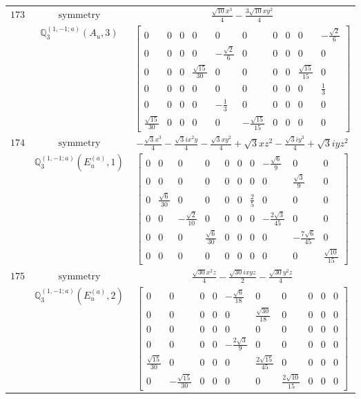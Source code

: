 \documentclass[fleqn,8pt,landscape]{jsarticle}
\begin{document}
\begin{longtable}{ccc}
$ 173 $ & $ \text{symmetry} $ & $ \frac{\sqrt{10} x^{3}}{4} - \frac{3 \sqrt{10} x y^{2}}{4} $ \\
$  $ & $ \mathbb{Q}_{3}^{(1,-1;a)}(A_{u},3) $ & $ \begin{bmatrix} 0 & 0 & 0 & 0 & 0 & 0 & 0 & 0 & 0 & - \frac{\sqrt{2}}{6} \\ 0 & 0 & 0 & 0 & - \frac{\sqrt{2}}{6} & 0 & 0 & 0 & 0 & 0 \\ 0 & 0 & 0 & \frac{\sqrt{15}}{30} & 0 & 0 & 0 & 0 & \frac{\sqrt{15}}{15} & 0 \\ 0 & 0 & 0 & 0 & 0 & 0 & 0 & 0 & 0 & \frac{1}{3} \\ 0 & 0 & 0 & 0 & - \frac{1}{3} & 0 & 0 & 0 & 0 & 0 \\ \frac{\sqrt{15}}{30} & 0 & 0 & 0 & 0 & - \frac{\sqrt{15}}{15} & 0 & 0 & 0 & 0 \end{bmatrix} $ \\ \hline
$ 174 $ & $ \text{symmetry} $ & $ - \frac{\sqrt{3} x^{3}}{4} - \frac{\sqrt{3} i x^{2} y}{4} - \frac{\sqrt{3} x y^{2}}{4} + \sqrt{3} x z^{2} - \frac{\sqrt{3} i y^{3}}{4} + \sqrt{3} i y z^{2} $ \\
$  $ & $ \mathbb{Q}_{3}^{(1,-1;a)}(E_{u}^{(a)},1) $ & $ \begin{bmatrix} 0 & 0 & 0 & 0 & 0 & 0 & 0 & - \frac{\sqrt{6}}{9} & 0 & 0 \\ 0 & 0 & 0 & 0 & 0 & 0 & 0 & 0 & \frac{\sqrt{3}}{9} & 0 \\ 0 & \frac{\sqrt{6}}{30} & 0 & 0 & 0 & 0 & \frac{2}{5} & 0 & 0 & 0 \\ 0 & 0 & - \frac{\sqrt{2}}{10} & 0 & 0 & 0 & 0 & - \frac{2 \sqrt{3}}{45} & 0 & 0 \\ 0 & 0 & 0 & \frac{\sqrt{6}}{30} & 0 & 0 & 0 & 0 & - \frac{7 \sqrt{6}}{45} & 0 \\ 0 & 0 & 0 & 0 & 0 & 0 & 0 & 0 & 0 & \frac{\sqrt{10}}{15} \end{bmatrix} $ \\ \hline
$ 175 $ & $ \text{symmetry} $ & $ \frac{\sqrt{30} x^{2} z}{4} - \frac{\sqrt{30} i x y z}{2} - \frac{\sqrt{30} y^{2} z}{4} $ \\
$  $ & $ \mathbb{Q}_{3}^{(1,-1;a)}(E_{u}^{(a)},2) $ & $ \begin{bmatrix} 0 & 0 & 0 & 0 & - \frac{\sqrt{6}}{18} & 0 & 0 & 0 & 0 & 0 \\ 0 & 0 & 0 & 0 & 0 & \frac{\sqrt{30}}{18} & 0 & 0 & 0 & 0 \\ 0 & 0 & 0 & 0 & 0 & 0 & 0 & 0 & 0 & 0 \\ 0 & 0 & 0 & 0 & - \frac{2 \sqrt{3}}{9} & 0 & 0 & 0 & 0 & 0 \\ \frac{\sqrt{15}}{30} & 0 & 0 & 0 & 0 & \frac{2 \sqrt{15}}{45} & 0 & 0 & 0 & 0 \\ 0 & - \frac{\sqrt{15}}{30} & 0 & 0 & 0 & 0 & \frac{2 \sqrt{10}}{15} & 0 & 0 & 0 \end{bmatrix} $ \\ \hline

\end{longtable}
\end{document}

